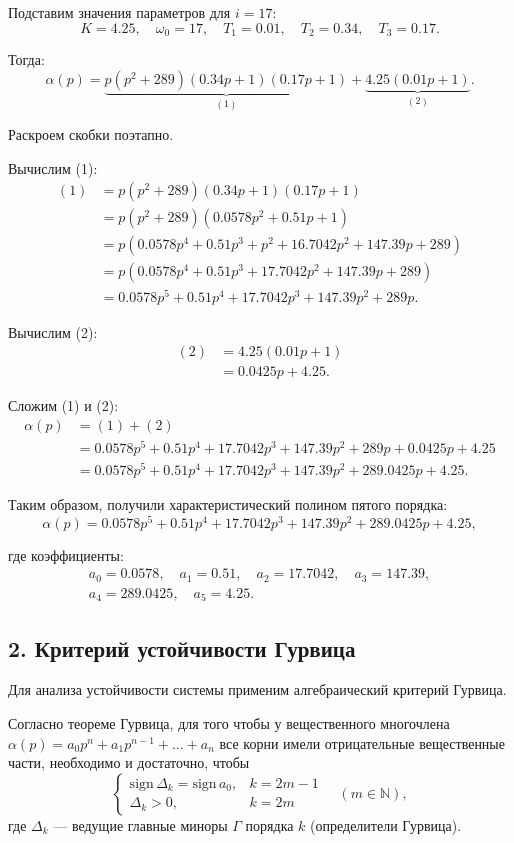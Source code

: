 Подставим значения параметров для $i = 17$:
\[
K = 4.25, \quad \omega_0 = 17, \quad T_1 = 0.01, \quad T_2 = 0.34, \quad T_3 = 0.17.
\]

Тогда:
\[
\alpha(p) = \underbrace{p(p^2 + 289)(0.34p + 1)(0.17p + 1)}_{(1)} + \underbrace{4.25(0.01p + 1)}_{(2)}.
\]

Раскроем скобки поэтапно.

Вычислим (1):
\begin{align*}
(1) &= p(p^2 + 289)(0.34p + 1)(0.17p + 1) \\
&= p(p^2 + 289)(0.0578p^2 + 0.51p + 1) \\
&= p(0.0578p^4 + 0.51p^3 + p^2 + 16.7042p^2 + 147.39p + 289) \\
&= p(0.0578p^4 + 0.51p^3 + 17.7042p^2 + 147.39p + 289) \\
&= 0.0578p^5 + 0.51p^4 + 17.7042p^3 + 147.39p^2 + 289p.
\end{align*}

Вычислим (2):
\begin{align*}
(2) &= 4.25(0.01p + 1) \\
&= 0.0425p + 4.25.
\end{align*}

Сложим (1) и (2):
\begin{align*}
\alpha(p) &= (1) + (2) \\
&= 0.0578p^5 + 0.51p^4 + 17.7042p^3 + 147.39p^2 + 289p + 0.0425p + 4.25 \\
&= 0.0578p^5 + 0.51p^4 + 17.7042p^3 + 147.39p^2 + 289.0425p + 4.25.
\end{align*}

Таким образом, получили характеристический полином пятого порядка:
\[
\alpha(p) = 0.0578 p^5 + 0.51 p^4 + 17.7042 p^3 + 147.39 p^2 + 289.0425 p + 4.25,
\]

где коэффициенты:
\begin{gather*}
  a_0 = 0.0578, \quad a_1 = 0.51, \quad a_2 = 17.7042, \quad a_3 = 147.39, \\
  a_4 = 289.0425, \quad a_5 = 4.25.
\end{gather*}

\subsection*{2. Критерий устойчивости Гурвица}

Для анализа устойчивости системы применим алгебраический критерий Гурвица.

Согласно теореме Гурвица, для того чтобы у вещественного многочлена $\alpha(p) = a_0 p^n + a_1 p^{n-1} + \ldots + a_n$ все корни имели отрицательные вещественные части, необходимо и достаточно, чтобы
\[
\begin{cases}
\mathrm{sign}\, \Delta_k = \mathrm{sign}\, a_0, & k = 2m - 1 \\
\Delta_k > 0, & k = 2m
\end{cases} \quad (m \in \mathbb{N}),
\]
где $\Delta_k$ — ведущие главные миноры $\Gamma$ порядка $k$ (определители Гурвица).

